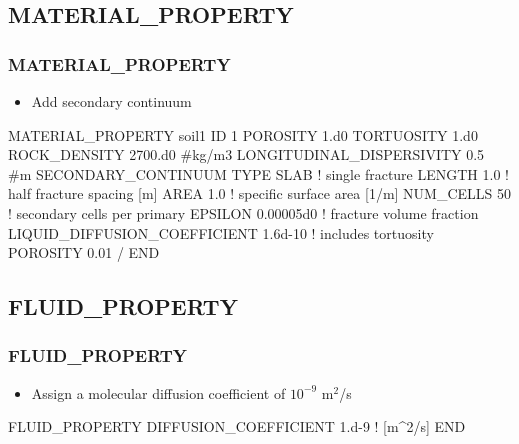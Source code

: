 \documentclass{beamer}
\newcommand\bluecomment[1]{{{\color{blue} #1}}}
\newcommand\magentacomment[1]{{{\color{magenta} #1}}}
\begin{document}
\subsection{MATERIAL\_PROPERTY}

\begin{frame}\frametitle{MATERIAL\_PROPERTY}

\begin{itemize}
  \item Add secondary continuum
\end{itemize}

\begin{semiverbatim}
MATERIAL_PROPERTY soil1
  ID 1
  POROSITY 1.d0
  TORTUOSITY 1.d0
  ROCK_DENSITY 2700.d0 #kg/m3
  LONGITUDINAL_DISPERSIVITY 0.5 #m
  \magentacomment{SECONDARY_CONTINUUM
    TYPE SLAB               \bluecomment{! single fracture}
    LENGTH 1.0              \bluecomment{! half fracture spacing [m]}
    AREA 1.0                \bluecomment{! specific surface area [1/m]}
    NUM_CELLS 50            \bluecomment{! secondary cells per primary}
    EPSILON 0.00005d0       \bluecomment{! fracture volume fraction}
    LIQUID_DIFFUSION_COEFFICIENT 1.6d-10  \bluecomment{! includes tortuosity}
    POROSITY 0.01
  / }
END
\end{semiverbatim}

\end{frame}

\subsection{FLUID\_PROPERTY}

\begin{frame}\frametitle{FLUID\_PROPERTY}

\begin{itemize}
  \item Assign a molecular diffusion coefficient of $10^{-9}$ m$^2$/s
\end{itemize}

\begin{semiverbatim}

FLUID_PROPERTY
  DIFFUSION_COEFFICIENT 1.d-9   \bluecomment{! [m^2/s]}
END
\end{semiverbatim}

\end{frame}
\end{document}
